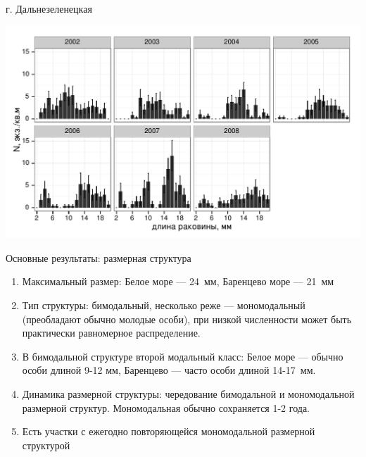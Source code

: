 \documentclass{beamer}
\begin{document}
\begin{frame}{г. Дальнезеленецкая}
 \begin{center}
		\includegraphics[width=\textwidth]{DZ_sizestr_oneplot.pdf}
 \end{center}
\end{frame}

\begin{frame}{Основные результаты: размерная структура}
	\begin{enumerate}
		\item Максимальный размер: Белое море --- 24~мм, Баренцево море --- 21~мм
		\item Тип структуры: бимодальный, несколько реже --- мономодальный (преобладают обычно молодые особи), при низкой численности может быть практически равномерное распределение.
		\item В бимодальной структуре второй модальный класс: Белое море --- обычно особи длиной 9-12 мм, Баренцево --- часто особи длиной 14-17~мм.
		\item Динамика размерной структуры: чередование бимодальной и мономодальной размерной структур. Мономодальная обычно сохраняется 1-2 года.
		\item Есть участки с ежегодно повторяющейся мономодальной размерной структурой
	\end{enumerate}
\end{frame}
\end{document}
